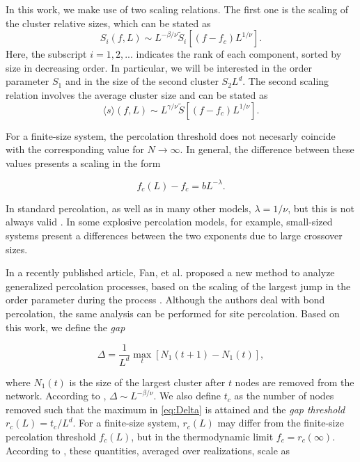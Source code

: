 \documentclass{article}
\begin{document}
In this work, we make use of two scaling relations. The first one is the scaling of the cluster relative sizes, which can be stated as  \cite{Zhu2017FiniteTransition}
%
\begin{equation}
\label{eq:comp-scaling}
S_i(f,L) \sim L^{-\beta /\nu} \tilde{S}_i[(f-f_c) L^{1/\nu}].
\end{equation}
%
 Here, the subscript $i=1,2, ...$ indicates the rank of each component, sorted by size in decreasing order. In particular, we will be interested in the order parameter $S_1$ and in the size of the second cluster $S_2L^d$. The second scaling relation involves the average cluster size and can be stated as
%
\begin{equation}
\label{eq:suscep-scaling}
\langle s \rangle(f,L)  \sim L^{\gamma / \nu} \tilde{S} [(f-f_c) L^{1/\nu}].
\end{equation}
%


For a finite-size system, the percolation threshold does not necesarly coincide with the corresponding value for $N\rightarrow \infty$. In general, the difference between these values presents a scaling in the form

\begin{equation} \label{eq:peak_pos_shift}
f_c(L) - f_c = b L^{-\lambda}.
\end{equation}

In standard percolation, as well as in many other models, $\lambda = 1/\nu$, but this is not always valid \cite{Li2012,Ziff2010ScalingLattice,Grassberger2011ExplosiveBehavior}. In some explosive percolation models, for example, small-sized systems present a differences between the two exponents due to large crossover sizes.

In a recently published article, Fan, et al. proposed a new method to analyze generalized percolation processes, based on the scaling of the largest jump in the order parameter during the process \cite{Fan2020}. Although the authors deal with bond percolation, the same analysis can be performed for site percolation. Based on this work, we define the \emph{gap}

\begin{equation} \label{eq:Delta}
\Delta = \dfrac{1}{L^d} \max_{t} \left[ N_1(t+1) - N_1(t) \right],
\end{equation} 

where $N_1(t)$ is the size of the largest cluster after $t$ nodes are removed from the network. According to \cite{Fan2020}, $\Delta\sim L^{-\beta/\nu}$. We also define $t_c$ as the number of nodes removed such that the maximum in \ref{eq:Delta} is attained and the \emph{gap threshold} $r_c(L) = t_c/L^d$. For a finite-size system, $r_c(L)$ may differ from the finite-size percolation threshold $f_c(L)$, but in the thermodynamic limit $f_c = r_c(\infty)$. %
According to \cite{Fan2020}, these quantities, averaged over realizations, scale as 
\end{document}
